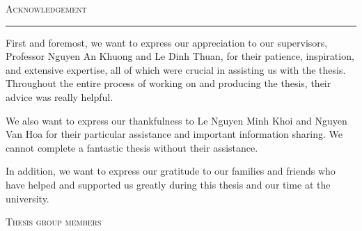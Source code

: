 \thispagestyle{empty}
\vspace*{3cm}
\noindent\Huge\textsc{Acknowledgement}\\
\normalsize
\noindent\rule[2pt]{\textwidth}{0.8pt}
\hspace*{5cm}
 
First and foremost, we want to express our appreciation to our supervisors, Professor Nguyen An Khuong and Le Dinh Thuan, for their patience, inspiration, and extensive expertise, all of which were crucial in assisting us with the thesis. Throughout the entire process of working on and producing the thesis, their advice was really helpful.

We also want to express our thankfulness to Le Nguyen Minh Khoi and Nguyen Van Hoa for their particular assistance and important information sharing. We cannot complete a fantastic thesis without their assistance.

In addition, we want to express our gratitude to our families and friends who have helped and supported us greatly during this thesis and our time at the university.
	
	\hfill \textsc{Thesis group members}
	
\cleardoublepage
